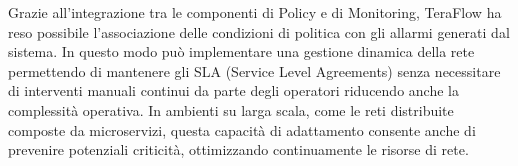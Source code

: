 Grazie all'integrazione tra le componenti di Policy e di Monitoring, TeraFlow ha reso possibile l'associazione delle condizioni di politica con gli allarmi generati dal sistema.
In questo modo può implementare una gestione dinamica della rete 
permettendo di mantenere gli SLA (Service Level Agreements) senza necessitare di interventi manuali continui da parte degli operatori riducendo anche la complessità operativa.
In ambienti su larga scala, come le reti distribuite composte da microservizi, questa capacità di adattamento consente anche di prevenire potenziali criticità, ottimizzando continuamente le risorse di rete.


